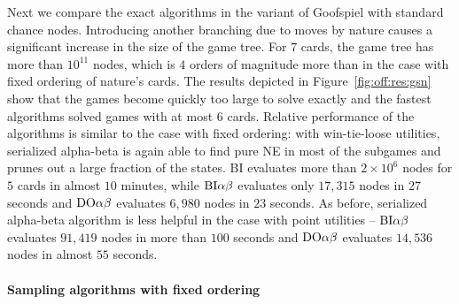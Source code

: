 Next we compare the exact algorithms in the variant of Goofspiel with standard chance nodes.
Introducing another branching due to moves by nature causes a significant increase in the size of the game tree.
For $7$ cards, the game tree has more than $10^{11}$ nodes, which is $4$ orders of magnitude more than in the case with fixed ordering of nature's cards.
The results depicted in Figure~\ref{fig:off:res:gsn} show that the games become quickly too large to solve exactly and the fastest algorithms solved games with at most $6$ cards.
Relative performance of the algorithms is similar to the case with fixed ordering: with win-tie-loose utilities, serialized alpha-beta is again able to find pure NE in most of the subgames and prunes out a large fraction of the states.
BI evaluates more than $2 \times 10^6$ nodes for $5$ cards in almost $10$ minutes, while $\textrm{BI}\alpha\beta$ evaluates only $17,315$ nodes in $27$ seconds and $\textrm{DO}\alpha\beta$ evaluates $6,980$ nodes in $23$ seconds.
As before, serialized alpha-beta algorithm is less helpful in the case with point utilities -- $\textrm{BI}\alpha\beta$ evaluates $91,419$ nodes in more than $100$ seconds and $\textrm{DO}\alpha\beta$ evaluates $14,536$ nodes in almost $55$ seconds.


\paragraph{Sampling algorithms with fixed ordering}

